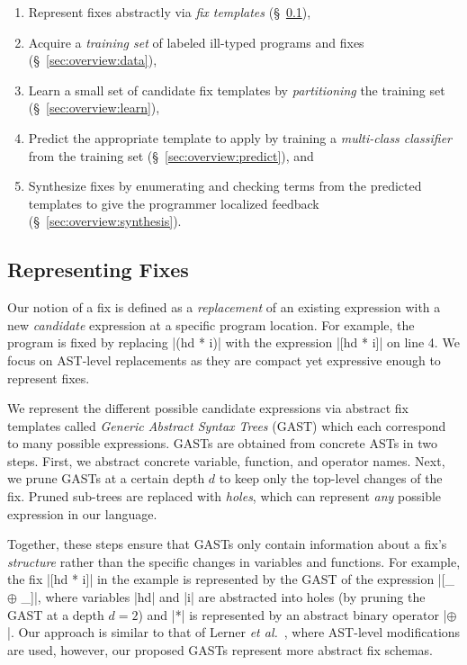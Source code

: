 \begin{enumerate}

  \item Represent fixes abstractly via \emph{fix templates}
        (\S~\ref{sec:overview:templates}),

  \item Acquire a \emph{training set} of labeled ill-typed programs and fixes
        (\S~\ref{sec:overview:data}),

  \item Learn a small set of candidate fix templates by \emph{partitioning}
        the training set (\S~\ref{sec:overview:learn}),

  \item Predict the appropriate template to apply by training a
        \emph{multi-class classifier} from the training set
        (\S~\ref{sec:overview:predict}), and

  \item Synthesize fixes by enumerating and checking terms from the
        predicted templates to give the programmer localized feedback
        (\S~\ref{sec:overview:synthesis}).
\end{enumerate}

\subsection{Representing Fixes}
\label{sec:overview:templates}

Our notion of a fix is defined as a \emph{replacement} of an existing expression
with a new \emph{candidate} expression at a specific program location. For
example, the \mbd program is fixed by replacing |(hd * i)| with the expression
|[hd * i]| on line 4. We focus on AST-level replacements as they are compact yet
expressive enough to represent fixes.


%
We represent the different possible candidate expressions via abstract fix
templates called \emph{Generic Abstract Syntax Trees} (GAST) which each
correspond to many possible expressions.
%
GASTs are obtained from concrete ASTs in two steps.
%
First, we abstract concrete variable, function, and operator names.
%
Next, we prune GASTs at a certain depth $d$ to keep only the top-level changes
of the fix. Pruned sub-trees are replaced with \emph{holes}, which can represent
\emph{any} possible expression in our language.


Together, these steps ensure that GASTs only contain information about a fix's
\emph{structure} rather than the specific changes in variables and functions.
%
For example, the fix |[hd * i]| in the \mbd example is represented by the GAST
of the expression |[_ $\oplus$ _]|, where variables |hd| and |i| are abstracted
into holes (\eg by pruning the GAST at a depth $d=2$) and |*| is represented by
an abstract binary operator |$\oplus$|. Our approach is similar to that of
Lerner \emph{et al.}~\citep{Lerner2007-dt}, where AST-level modifications are
used, however, our proposed GASTs represent more abstract fix schemas.


